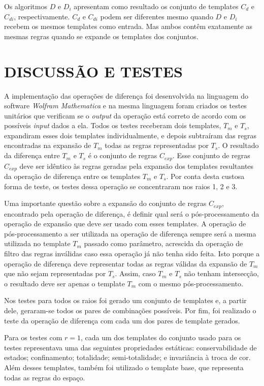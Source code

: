 Os algoritmos $D$ e $D_i$ apresentam como resultado os conjunto de templates $C_d$ e $C_{di}$, respectivamente. $C_d$ e $C_{di}$ podem ser diferentes mesmo quando $D$ e $D_i$ recebem os mesmos templates como entrada. Mas ambos contêm exatamente as mesmas regras quando se expande os templates dos conjuntos.

\section{DISCUSSÃO E TESTES}
\label{sec:discussoesETestes}
A implementação das operações de diferença foi desenvolvida na linguagem do software \textit{Wolfram Mathematica} \cite{woframMathematica10} e na mesma linguagem foram criados os testes unitários que verificam se o \textit{output} da operação está correto de acordo com os possíveis \textit{input} dados a ela. Todos os testes receberam dois templates, $T_m$ e $T_s$, expandiram esses dois templates individualmente, e depois subtraíram das regras encontradas na expansão de $T_m$ todas as regras representadas por $T_s$. O resultado da diferença entre $T_m$ e $T_s$ é o conjunto de regras $C_{exp}$. Esse conjunto de regras $C_{exp}$ deve ser idêntico às regras geradas pela expansão dos templates resultantes da operação de diferença entre os templates $T_m$ e $T_s$. Por conta desta custosa forma de teste, os testes dessa operação se concentraram nos raios 1, 2 e 3.

Uma importante questão sobre a expansão do conjunto de regras $C_{exp}$, encontrado pela operação de diferença, é definir qual será o pós-processamento da operação de expansão que deve ser usado com esses templates. A operação de pós-processamento a ser utilizada na operação de diferença sempre será a mesma utilizada no template $T_m$ passado como parâmetro, acrescida da operação de filtro das regras inválidas caso essa operação já não tenha sido feita. Isto porque a operação de diferença deve representar todas as regras válidas da expansão de $T_m$ que não sejam representadas por $T_s$. Assim, caso $T_m$ e $T_s$ não tenham intersecção, o resultado deve ser apenas o template $T_m$ com o mesmo pós-processamento.

Nos testes para todos os raios foi gerado um conjunto de templates e, a partir dele, geraram-se todos os pares de combinações possíveis. Por fim, foi realizado o teste da operação de diferença com cada um dos pares de template gerados.

Para os testes com $r = 1$, cada um dos templates do conjunto usado para os testes representava uma das seguintes propriedades estáticas: conservabilidade de estados; confinamento; totalidade; semi-totalidade; e invariância  à troca de cor. Além desses templates, também foi utilizado o template base, que representa todas as regras do espaço.

